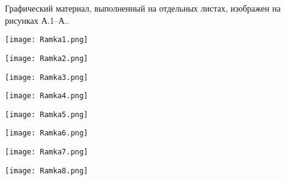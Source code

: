 
Графический материал, выполненный на отдельных листах,
изображен на рисунках А.1--А..
\setcounter{числоПлакатов}{0}

\renewcommand{\thefigure}{А.\arabic{figure}} %

\begin{landscape}

\begin{плакат}
    \texttt{[image: Ramka1.png]}
    \label{pl1:image}      
\end{плакат}

\begin{плакат}
    \texttt{[image: Ramka2.png]}
    \label{pl2:image}      
\end{плакат}

\begin{плакат}
    \texttt{[image: Ramka3.png]}
    \label{pl3:image}      
\end{плакат}

\begin{плакат}
    \texttt{[image: Ramka4.png]}
    \label{pl4:image}      
\end{плакат}

\begin{плакат}
	\texttt{[image: Ramka5.png]}
	\label{pl5:image}      
\end{плакат}

\begin{плакат}
	\texttt{[image: Ramka6.png]}
	\label{pl6:image}      
\end{плакат}

\begin{плакат}
	\texttt{[image: Ramka7.png]}
	\label{pl7:image}      
\end{плакат}

\begin{плакат}
	\texttt{[image: Ramka8.png]}
	\label{pl8:image}      
\end{плакат}

\end{landscape}
